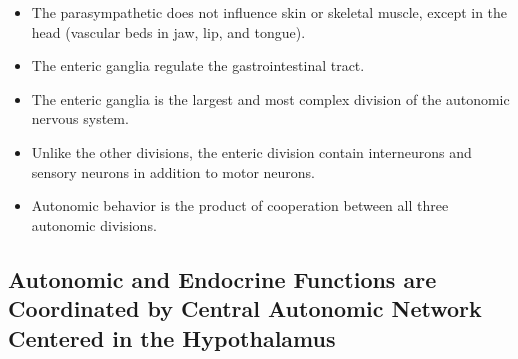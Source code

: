 \documentclass[12pt,a4paper]{article}
\begin{document}
\begin{itemize}
    \item The parasympathetic does not influence skin or skeletal muscle, except in the head (vascular beds in jaw, lip, and tongue).
    \item The enteric ganglia regulate the gastrointestinal tract.
    \item The enteric ganglia is the largest and most complex division of the autonomic nervous system. 
    \item Unlike the other divisions, the enteric division contain interneurons and sensory neurons in addition to motor neurons.
    \item Autonomic behavior is the product of cooperation between all three autonomic divisions.
\end{itemize}

\subsection{Autonomic and Endocrine Functions are Coordinated by Central Autonomic Network Centered in the Hypothalamus}
\end{document}
